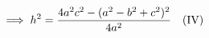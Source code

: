 \documentclass[preview]{standalone}
\begin{document}
\begin{align*}
\special{dvisvgm:raw <g id='unique000'>}\Longrightarrow\; h^2 = \frac{4a^2c^2 - (a^2 - b^2 + c^2)^2}{4a^2} \special{dvisvgm:raw </g>}\special{dvisvgm:raw <g id='unique001'>}\quad \text{(IV)}\special{dvisvgm:raw </g>}
\end{align*}
\end{document}
